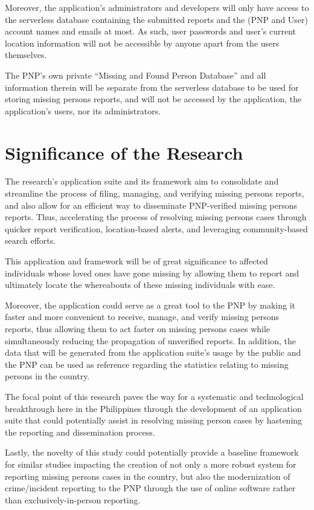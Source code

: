 Moreover, the application’s administrators and developers will only have access to the serverless database containing the submitted reports and the (PNP and User) account names and emails at most. As such, user passwords and user’s current location information will not be accessible by anyone apart from the users themselves. 

The PNP’s own private “Missing and Found Person Database” and all information therein will be separate from the serverless database to be used for storing missing persons reports, and will not be accessed by the application, the application’s users, nor its administrators.

\section{Significance of the Research}
\label{sec:significance}
The research’s application suite and its framework aim to consolidate and streamline the process of filing, managing, and verifying missing persons reports, and also allow for an efficient way to disseminate PNP-verified missing persons reports. Thus, accelerating the process of resolving missing persons cases through quicker report verification, location-based alerts, and leveraging community-based search efforts. 

This application and framework will be of great significance to affected individuals whose loved ones have gone missing by allowing them to report and ultimately locate the whereabouts of these missing individuals with ease.

Moreover, the application could serve as a great tool to the PNP by making it faster and more convenient to receive, manage, and verify missing persons reports, thus allowing them to act faster on missing persons cases while simultaneously reducing the propagation of unverified reports. In addition, the data that will be generated from the application suite’s usage by the public and the PNP can be used as reference regarding the statistics relating to missing persons in the country. 

The focal point of this research paves the way for a systematic and technological breakthrough here in the Philippines through the development of an application suite that could potentially assist in resolving missing person cases by hastening the reporting and dissemination process.

Lastly, the novelty of this study could potentially provide a baseline framework for similar studies impacting the creation of not only a more robust system for reporting missing persons cases in the country, but also the modernization of crime/incident reporting to the PNP through the use of online software rather than exclusively-in-person reporting.





